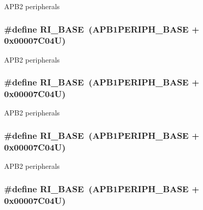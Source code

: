 A\-P\-B2 peripherals \hypertarget{group___peripheral__memory__map_ga8fdc749e6f184b3cd9b01f179af62e4c}{
\subsubsection[{R\-I\-\_\-\-B\-A\-S\-E}]{\setlength{\rightskip}{0pt plus 5cm}\#define R\-I\-\_\-\-B\-A\-S\-E~(A\-P\-B1\-P\-E\-R\-I\-P\-H\-\_\-\-B\-A\-S\-E + 0x00007\-C04\-U)}}\label{group___peripheral__memory__map_ga8fdc749e6f184b3cd9b01f179af62e4c}
A\-P\-B2 peripherals \hypertarget{group___peripheral__memory__map_ga8fdc749e6f184b3cd9b01f179af62e4c}{
\subsubsection[{R\-I\-\_\-\-B\-A\-S\-E}]{\setlength{\rightskip}{0pt plus 5cm}\#define R\-I\-\_\-\-B\-A\-S\-E~(A\-P\-B1\-P\-E\-R\-I\-P\-H\-\_\-\-B\-A\-S\-E + 0x00007\-C04\-U)}}\label{group___peripheral__memory__map_ga8fdc749e6f184b3cd9b01f179af62e4c}
A\-P\-B2 peripherals \hypertarget{group___peripheral__memory__map_ga8fdc749e6f184b3cd9b01f179af62e4c}{
\subsubsection[{R\-I\-\_\-\-B\-A\-S\-E}]{\setlength{\rightskip}{0pt plus 5cm}\#define R\-I\-\_\-\-B\-A\-S\-E~(A\-P\-B1\-P\-E\-R\-I\-P\-H\-\_\-\-B\-A\-S\-E + 0x00007\-C04\-U)}}\label{group___peripheral__memory__map_ga8fdc749e6f184b3cd9b01f179af62e4c}
A\-P\-B2 peripherals \hypertarget{group___peripheral__memory__map_ga8fdc749e6f184b3cd9b01f179af62e4c}{
\subsubsection[{R\-I\-\_\-\-B\-A\-S\-E}]{\setlength{\rightskip}{0pt plus 5cm}\#define R\-I\-\_\-\-B\-A\-S\-E~(A\-P\-B1\-P\-E\-R\-I\-P\-H\-\_\-\-B\-A\-S\-E + 0x00007\-C04\-U)}}\label{group___peripheral__memory__map_ga8fdc749e6f184b3cd9b01f179af62e4c}
